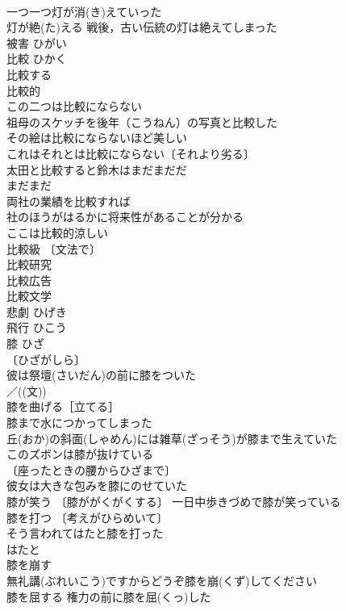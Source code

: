\documentclass[8pt]{extreport}
\begin{document}
\begin{CJK}{UTF8}{min}
\\	一つ一つ灯が消(き)えていった 
\\	灯が絶(た)える 戦後，古い伝統の灯は絶えてしまった 
\\	被害	ひがい	
\\	比較	ひかく	
\\	比較する 
\\	比較的 
\\	この二つは比較にならない 
\\	祖母のスケッチを後年（こうねん）の写真と比較した 
\\	その絵は比較にならないほど美しい 
\\	これはそれとは比較にならない〔それより劣る〕 
\\	太田と比較すると鈴木はまだまだだ 
\\	まだまだ　
\\	両社の業績を比較すれば
\\	社のほうがはるかに将来性があることが分かる 
\\	ここは比較的涼しい 
\\	比較級 〔文法で〕
\\	比較研究 
\\	比較広告 
\\	比較文学 
\\	悲劇	ひげき	
\\	飛行	ひこう	
\\	膝	ひざ	
\\	〔ひざがしら〕
\\	彼は祭壇(さいだん)の前に膝をついた 
\\	／((文)) 
\\	膝を曲げる［立てる］ 
\\	膝まで水につかってしまった 
\\	丘(おか)の斜面(しゃめん)には雑草(ざっそう)が膝まで生えていた 
\\	このズボンは膝が抜けている 
\\	〔座ったときの腰からひざまで〕
\\	彼女は大きな包みを膝にのせていた 
\\	膝が笑う 〔膝ががくがくする〕 一日中歩きづめで膝が笑っている 
\\	膝を打つ 〔考えがひらめいて〕
\\	そう言われてはたと膝を打った 
\\	はたと 
\\	膝を崩す　
\\	無礼講(ぶれいこう)ですからどうぞ膝を崩(くず)してください 
\\	膝を屈する 権力の前に膝を屈(くっ)した 

\end{CJK}
\end{document}
